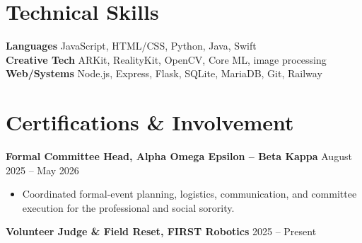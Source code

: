 \documentclass[letterpaper,10pt]{article}
\newcommand{\activityentry}[2]{
  \noindent\textbf{#1} \hfill #2
}
\begin{document}
\section{Technical Skills}

\noindent\textbf{Languages} \quad JavaScript, HTML/CSS, Python, Java, Swift \\[1pt]
\noindent\textbf{Creative Tech} \quad ARKit, RealityKit, OpenCV, Core ML, image processing \\[1pt]
\noindent\textbf{Web/Systems} \quad Node.js, Express, Flask, SQLite, MariaDB, Git, Railway

\section{Certifications \& Involvement}

\activityentry
  {Formal Committee Head, Alpha Omega Epsilon -- Beta Kappa}{August 2025 -- May 2026}
\begin{itemize}
  \item Coordinated formal-event planning, logistics, communication, and committee execution for the professional and social sorority.
\end{itemize}

\smallskip

\activityentry
  {Volunteer Judge \& Field Reset, FIRST Robotics}{2025 -- Present}
\end{document}
